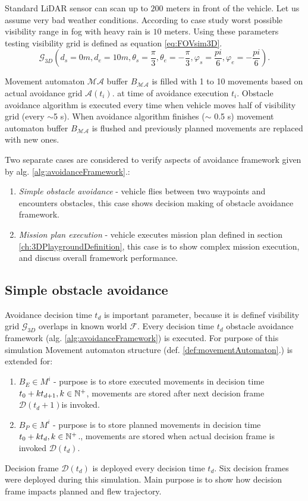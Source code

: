 Standard LiDAR sensor can scan up to $200$ meters in front of the vehicle. Let us assume very bad weather conditions. According to case study \cite{ramasamy2016lidar} worst possible visibility range in fog with heavy rain is $10$ meters. Using these parameters testing visibility grid is defined as equation \ref{eq:FOVsim3D}.
\begin{equation}\label{eq:FOVsim3D}
    \mathscr{G}_{3D}(d_s=0m,d_e=10m,\theta_s = \frac{\pi}{3},\theta_e =-\frac{\pi}{3},\varphi_s =\frac{pi}{6},\varphi_e=-\frac{pi}{6}).     
\end{equation}


\noindent Movement automaton $\mathscr{MA}$ buffer $B_{\mathscr{MA}}$ is filled with 1 to 10 movements based on actual avoidance grid $\mathscr{A}(t_i)$. at time of avoidance execution $t_i$. Obstacle avoidance algorithm is executed every time when vehicle moves half of visibility grid (every $\sim$5 s). When avoidance algorithm finishes ($\sim$ 0.5 s) movement automaton buffer $B_{\mathscr{MA}}$ is flushed and previously planned movements are replaced with new ones.

Two separate cases are considered to verify aspects of avoidance framework given by alg. \ref{alg:avoidanceFramework}.:
\begin{enumerate}
    \item \textit{Simple obstacle avoidance} - vehicle flies between two waypoints and encounters obstacles, this case shows decision making of obstacle avoidance framework.
    \item \textit{Mission plan execution} - vehicle executes mission plan defined in section \ref{ch:3DPlaygroundDefinition}, this case is to show complex mission execution, and discuss overall framework performance.
\end{enumerate}

\subsection{Simple obstacle avoidance}
\noindent Avoidance decision time $t_d$ is important parameter, because it is definef visibility grid $\mathscr{G}_{3D}$ overlaps in known world $\mathscr{F}$. Every decision time $t_d$ obstacle avoidance framework (alg. \ref{alg:avoidanceFramework}) is executed. For purpose of this simulation Movement automaton structure (def. \ref{def:movementAutomaton}.) is extended for:
\begin{enumerate}
    \item {} $B_E\in M^i$ - purpose is to store executed movements in decision time $t_0+kt_{d+1},k\in\mathbb{N}^+$, movements are stored after next decision frame $\mathscr{D}(t_d+1)$is invoked.
    \item {} $B_P\in M^i$ - purpose is to store planned movements in decision time $t_0+kt_{d},k\in\mathbb{N}^+$., movements are stored when actual decision frame is invoked $\mathscr{D}(t_d)$.
\end{enumerate}
Decision frame $\mathscr{D}(t_d)$  is deployed every decision time $t_d$. Six decision frames were deployed during this simulation. Main purpose is to show how decision frame impacts planned and flew trajectory.



